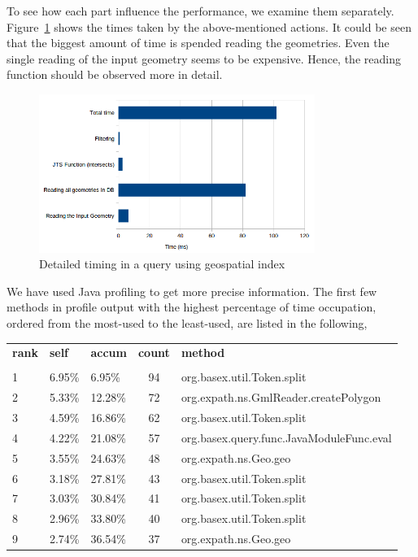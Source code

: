 \documentclass[a4paper,12pt]{article}
\begin{document}
To see how each part influence the performance, we examine them separately. Figure~\ref{figDetailedTiming} shows the times taken by the above-mentioned actions. It could be seen that the biggest amount of time is spended reading the geometries. Even the single reading of the input geometry seems to be expensive. Hence, the reading function should be observed more in detail.

\begin{figure}
\centering
\includegraphics[width=0.8\textwidth,height=0.25\textheight]{detailedTiming}
\caption{Detailed timing in a query using geospatial index}
\label{figDetailedTiming}
\end{figure}


We have used Java profiling to get more precise information. The first few methods in profile output with the highest percentage of time occupation, ordered from the most-used to the least-used, are listed in the following,

\vspace{10px}
\begin{tabular}{l l l c l}
\textbf{rank} & \textbf{self} & \textbf{accum} & \textbf{count} & \textbf{method} \\
 & & & &\\
1 & 6.95\% & 6.95\% & 94 & org.basex.util.Token.{\color{red}split}\\
2 & 5.33\% & 12.28\% & 72 & org.expath.ns.GmlReader.createPolygon \\
3 & 4.59\% & 16.86\% & 62 & org.basex.util.Token.{\color{red}split} \\
4 & 4.22\% & 21.08\% & 57 & org.basex.query.func.JavaModuleFunc.eval \\
5 & 3.55\% & 24.63\% & 48 & org.expath.ns.Geo.geo \\
6 & 3.18\% & 27.81\% & 43 & org.basex.util.Token.{\color{red}split} \\
7 & 3.03\% & 30.84\% & 41 & org.basex.util.Token.{\color{red}split} \\
8 & 2.96\% & 33.80\% & 40 & org.basex.util.Token.{\color{red}split} \\
9 & 2.74\% & 36.54\% & 37 & org.expath.ns.Geo.geo \\
\end{tabular}
\vspace{10px}
\end{document}

